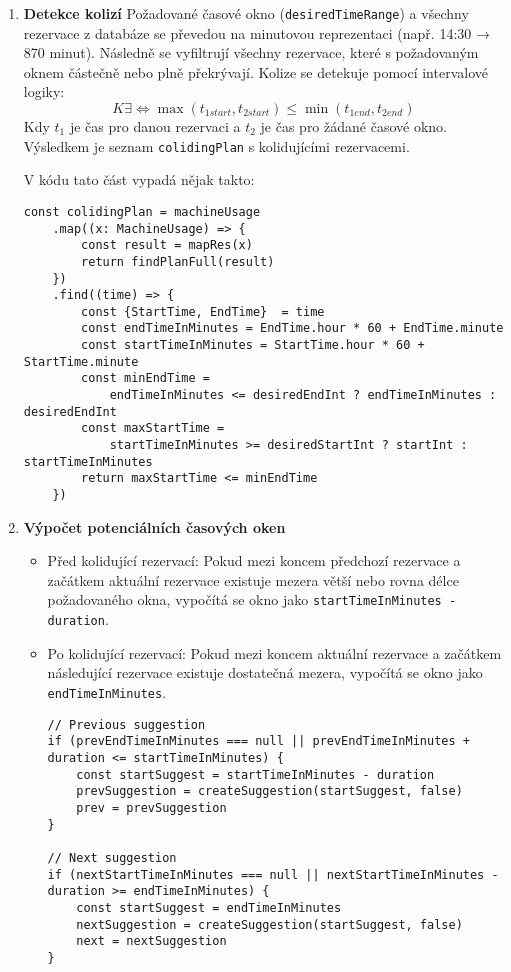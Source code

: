 \begin{enumerate}
    \item \textbf{Detekce kolizí}
	Požadované časové okno (\texttt{desiredTimeRange}) a všechny rezervace z databáze se převedou na minutovou reprezentaci (např. 14:30 → 870 minut). Následně se vyfiltrují všechny rezervace, které s požadovaným oknem částečně nebo plně překrývají. Kolize se detekuje pomocí intervalové logiky:
\[
K \exists \iff \max(t_{1start}, t_{2start}) \leq \min(t_{1end}, t_{2end})
\]
	Kdy \( t_{1} \) je čas pro danou rezervaci a \( t_{2} \) je čas pro žádané časové okno.
	Výsledkem je seznam \texttt{colidingPlan} s kolidujícími rezervacemi.
	
	V kódu tato část vypadá nějak takto:
	
    \begin{lstlisting}
const colidingPlan = machineUsage
	.map((x: MachineUsage) => {
	    const result = mapRes(x)
	    return findPlanFull(result)
	})
	.find((time) => {
	    const {StartTime, EndTime}  = time
	    const endTimeInMinutes = EndTime.hour * 60 + EndTime.minute
	    const startTimeInMinutes = StartTime.hour * 60 + StartTime.minute
	    const minEndTime =
		    endTimeInMinutes <= desiredEndInt ? endTimeInMinutes : desiredEndInt
	    const maxStartTime =
		    startTimeInMinutes >= desiredStartInt ? startInt : startTimeInMinutes
	    return maxStartTime <= minEndTime
	})
    \end{lstlisting}

    \item \textbf{Výpočet potenciálních časových oken}
    \begin{itemize}
    	\item Před kolidující rezervací: Pokud mezi koncem předchozí rezervace a začátkem aktuální rezervace existuje mezera větší nebo rovna délce požadovaného okna, vypočítá se okno jako \texttt{startTimeInMinutes - duration}.
    	\item Po kolidující rezervací: Pokud mezi koncem aktuální rezervace a začátkem následující rezervace existuje dostatečná mezera, vypočítá se okno jako \texttt{endTimeInMinutes}. 
	

    \begin{lstlisting}
// Previous suggestion
if (prevEndTimeInMinutes === null || prevEndTimeInMinutes + duration <= startTimeInMinutes) {
    const startSuggest = startTimeInMinutes - duration
    prevSuggestion = createSuggestion(startSuggest, false)
    prev = prevSuggestion
}

// Next suggestion
if (nextStartTimeInMinutes === null || nextStartTimeInMinutes - duration >= endTimeInMinutes) {
    const startSuggest = endTimeInMinutes
    nextSuggestion = createSuggestion(startSuggest, false)
    next = nextSuggestion
}
    \end{lstlisting}
    \end{itemize}


\end{enumerate}
